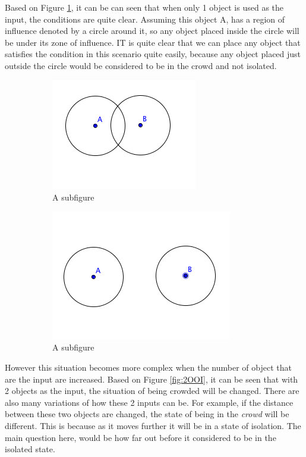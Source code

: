 \documentclass[a4paper,11pt]{article}
\begin{document}
Based on Figure \ref{fig:1OOI}, it can be can seen that when only 1 object is used as the input, the conditions are quite clear. Assuming this object A, has a region of influence denoted by a circle around it, so any object placed inside the circle will be under its zone of influence. IT is quite clear that we can place any object that satisfies the condition in this scenario quite easily, because any object placed just outside the circle would be considered to be in the crowd and not isolated. 

\begin{figure}[h]
\centering
\begin{subfigure}{.4\textwidth}
  \centering
  \includegraphics[width=.4\linewidth]{2OOIClose}
  \caption{A subfigure}
  \label{fig:1OOI}
\end{subfigure}%
\begin{subfigure}{.4\textwidth}
  \centering
  \includegraphics[width=.4\linewidth]{2OOIFar}
  \caption{A subfigure}
  \label{fig:2OOIFar}
\end{subfigure}
\caption{}
\label{fig:Condition}
\end{figure}


However this situation becomes more complex when the number of object that are the input are increased. Based on Figure \ref{fig:2OOI}, it can be seen that with 2 objects as the input, the situation of being crowded will be changed. There are also many variations of how these 2 inputs can be. For example, if the distance between these two objects are changed, the state of being in the \textit{crowd} will be different. This is because as it moves further it will be in a state of isolation. The main question here, would be how far out before it considered to be in the isolated state.
\end{document}

